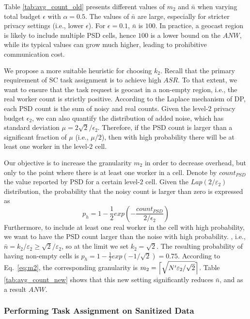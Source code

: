 \documentclass{USC-Thesis}
\DeclarePairedDelimiter{\ceil}{\lceil}{\rceil}
\numberwithin{equation}{chapter}
\begin{document}
Table \ref{tab:avg_count_old} presents different values of $m_2$ and $\bar{n}$ when varying total budget $\epsilon$ with $\alpha=0.5$. The values of $\bar{n}$ are large, especially for stricter privacy settings (i.e., lower $\epsilon$). For $\epsilon=0.1$, $\bar{n}$ is $100$. In practice, a geocast region is likely to include multiple PSD cells, hence $100$ is a lower bound on the $\mathit{ANW}$, while its typical values can grow much higher, leading to prohibitive communication cost. 

We propose a more suitable heuristic for choosing $k_2$. Recall that the primary requirement of SC task assignment is to achieve high $\mathit{ASR}$. To that extent, we want to ensure that the task request is geocast in a non-empty region, i.e., the real worker count is strictly positive. According to the Laplace mechanism of DP, each PSD count is the sum of noisy and real counts. Given the level-$2$ privacy budget $\epsilon_2$, we can also quantify the distribution of added noise, which has standard deviation $\mu=2\sqrt{2}/\epsilon_2$. Therefore, if the PSD count is larger than a significant fraction of $\mu$ (i.e., $\mu/2$), then with high probability there will be at least one worker in the level-$2$ cell.

Our objective is to increase the granularity $m_2$ in order to decrease overhead, but only to the point where there is at least one worker in a cell. Denote by $count_{PSD}$ the value reported by PSD for a certain level-$2$ cell. Given the $Lap(2/\varepsilon_2)$ distribution, the probability that the noisy count is larger than zero is expressed as
$$p_h=1-\frac{1}{2}exp(-\frac{count_{PSD}}{2/\epsilon_2})$$
Furthermore, to include at least one real worker in the cell with high probability, we want to have the PSD count larger than the noise with high probability. , i.e., $\bar{n}=k_2/\varepsilon_2\ge \sqrt{2}/\varepsilon_2$, so at the limit we set $k_2=\sqrt{2}$. The resulting probability of having non-empty cells is $p_h=1-\frac{1}{2}exp(-1/\sqrt{2})=0.75$.
According to Eq.~\eqref{eq:m2}, the corresponding granularity is $m_2=\ceil[\Big]{\sqrt{N'\varepsilon_2/\sqrt{2}}}$. Table \ref{tab:avg_count_new} shows that this new setting significantly reduces $\bar{n}$, and as a result $\mathit{ANW}$.


\subsubsection{Performing Task Assignment on Sanitized Data}
\label{sec:geocast}
\end{document}
